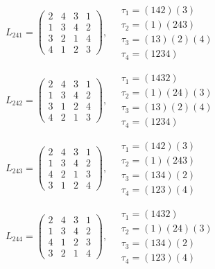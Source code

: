 $L_{241} = \begin{pmatrix} 2 & 4 & 3 & 1 \\ 1 & 3 & 4 & 2 \\ 3 & 2 & 1 & 4 \\ 4 & 1 & 2 & 3 \end{pmatrix}, \quad \begin{matrix} \tau_{1} = (1 4 2)(3) \\ \tau_{2} = (1)(2 4 3) \\ \tau_{3} = (1 3)(2)(4) \\ \tau_{4} = (1 2 3 4) \end{matrix}$

$L_{242} = \begin{pmatrix} 2 & 4 & 3 & 1 \\ 1 & 3 & 4 & 2 \\ 3 & 1 & 2 & 4 \\ 4 & 2 & 1 & 3 \end{pmatrix}, \quad \begin{matrix} \tau_{1} = (1 4 3 2) \\ \tau_{2} = (1)(2 4)(3) \\ \tau_{3} = (1 3)(2)(4) \\ \tau_{4} = (1 2 3 4) \end{matrix}$

$L_{243} = \begin{pmatrix} 2 & 4 & 3 & 1 \\ 1 & 3 & 4 & 2 \\ 4 & 2 & 1 & 3 \\ 3 & 1 & 2 & 4 \end{pmatrix}, \quad \begin{matrix} \tau_{1} = (1 4 2)(3) \\ \tau_{2} = (1)(2 4 3) \\ \tau_{3} = (1 3 4)(2) \\ \tau_{4} = (1 2 3)(4) \end{matrix}$

$L_{244} = \begin{pmatrix} 2 & 4 & 3 & 1 \\ 1 & 3 & 4 & 2 \\ 4 & 1 & 2 & 3 \\ 3 & 2 & 1 & 4 \end{pmatrix}, \quad \begin{matrix} \tau_{1} = (1 4 3 2) \\ \tau_{2} = (1)(2 4)(3) \\ \tau_{3} = (1 3 4)(2) \\ \tau_{4} = (1 2 3)(4) \end{matrix}$

